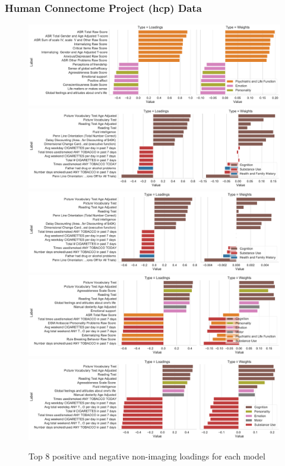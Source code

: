 \subsubsection{Human Connectome Project (\acrshort{hcp}) Data}

\begin{figure}
    \centering
    \includegraphics[width=0.8\linewidth]{figures/hcp/PCA behaviour weights and loadings}
    \includegraphics[width=0.8\linewidth]{figures/hcp/RCCA behaviour weights and loadings}
    \includegraphics[width=0.8\linewidth]{figures/hcp/ElasticNet behaviour weights and loadings}
    \includegraphics[width=0.8\linewidth]{figures/hcp/PLS behaviour weights and loadings}
    \includegraphics[width=0.8\linewidth]{figures/hcp/SPLS behaviour weights and loadings}
    \caption{Top 8 positive and negative non-imaging \gls{loadings} for each model}
\end{figure}

